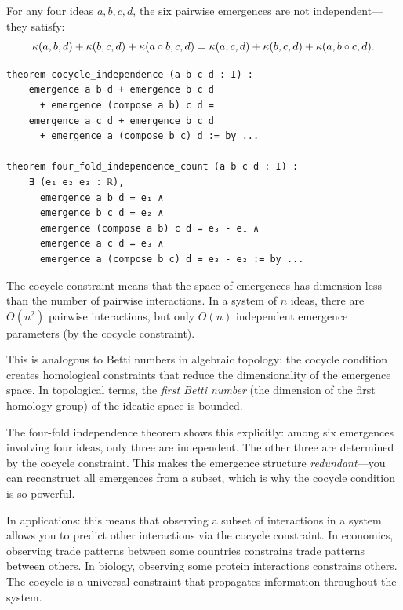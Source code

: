 \begin{theorem}
\label{thm:four-fold-independence}
For any four ideas $a, b, c, d$, the six pairwise emergences are not independent---they
satisfy:
\[
  \kappa(a,b,d) + \kappa(b,c,d) + \kappa(a \circ b, c, d) =
  \kappa(a,c,d) + \kappa(b,c,d) + \kappa(a, b \circ c, d).
\]
\end{theorem}

\begin{lstlisting}[caption={Cocycle independence (IDT\_v3\_Emergence.lean)}]
theorem cocycle_independence (a b c d : I) :
    emergence a b d + emergence b c d
      + emergence (compose a b) c d =
    emergence a c d + emergence b c d
      + emergence a (compose b c) d := by ...
      
theorem four_fold_independence_count (a b c d : I) :
    ∃ (e₁ e₂ e₃ : ℝ),
      emergence a b d = e₁ ∧
      emergence b c d = e₂ ∧
      emergence (compose a b) c d = e₃ - e₁ ∧
      emergence a c d = e₃ ∧
      emergence a (compose b c) d = e₃ - e₂ := by ...
\end{lstlisting}

\begin{interpretation}
The cocycle constraint means that the space of emergences has dimension less than
the number of pairwise interactions. In a system of $n$ ideas, there are
$O(n^2)$ pairwise interactions, but only $O(n)$ independent emergence parameters
(by the cocycle constraint).

This is analogous to Betti numbers in algebraic topology: the cocycle condition
creates homological constraints that reduce the dimensionality of the emergence
space. In topological terms, the \emph{first Betti number} (the dimension of
the first homology group) of the ideatic space is bounded.

The four-fold independence theorem shows this explicitly: among six emergences
involving four ideas, only three are independent. The other three are determined
by the cocycle constraint. This makes the emergence structure \emph{redundant}---you
can reconstruct all emergences from a subset, which is why the cocycle condition
is so powerful.

In applications: this means that observing a subset of interactions in a system
allows you to predict other interactions via the cocycle constraint. In economics,
observing trade patterns between some countries constrains trade patterns between
others. In biology, observing some protein interactions constrains others. The
cocycle is a universal constraint that propagates information throughout the
system.
\end{interpretation}

